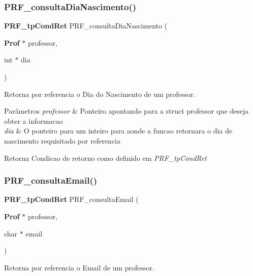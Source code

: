 \subsubsection{P\+R\+F\+\_\+consulta\+Dia\+Nascimento()}
{\footnotesize\ttfamily \textbf{ P\+R\+F\+\_\+tp\+Cond\+Ret} P\+R\+F\+\_\+consulta\+Dia\+Nascimento (\begin{DoxyParamCaption}\item[{\textbf{ Prof} $\ast$}]{professor,  }\item[{int $\ast$}]{dia }\end{DoxyParamCaption})}



Retorna por referencia o Dia do Nascimento de um professor. 


\begin{DoxyParams}{Parâmetros}
{\em professor} & Ponteiro apontando para a struct professor que deseja obter a informacao \\
\hline
{\em dia} & O ponteiro para um inteiro para aonde a funcao retornara o dia de nascimento requisitado por referencia \\
\hline
\end{DoxyParams}
\begin{DoxyReturn}{Retorna}
Condicao de retorno como definido em {\itshape P\+R\+F\+\_\+tp\+Cond\+Ret} 
\end{DoxyReturn}
\mbox{\label{group__modulo_professor_ga8f82f0083292830b07ae87886b1391f4}} 
\subsubsection{P\+R\+F\+\_\+consulta\+Email()}
{\footnotesize\ttfamily \textbf{ P\+R\+F\+\_\+tp\+Cond\+Ret} P\+R\+F\+\_\+consulta\+Email (\begin{DoxyParamCaption}\item[{\textbf{ Prof} $\ast$}]{professor,  }\item[{char $\ast$}]{email }\end{DoxyParamCaption})}



Retorna por referencia o Email de um professor. 


